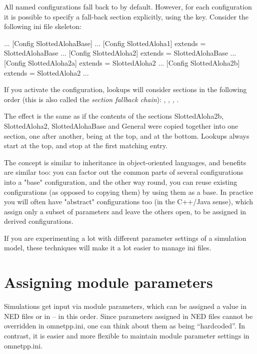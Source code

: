 All named configurations fall back to \ttt{[General]} by default. However, for
each configuration it is possible to specify a fall-back section
explicitly, using the  key. Consider the following ini file
skeleton:

\begin{inifile}
[General]
...
[Config SlottedAlohaBase]
...
[Config SlottedAloha1]
extends = SlottedAlohaBase
...
[Config SlottedAloha2]
extends = SlottedAlohaBase
...
[Config SlottedAloha2a]
extends = SlottedAloha2
...
[Config SlottedAloha2b]
extends = SlottedAloha2
...
\end{inifile}


If you activate the  configuration, lookups will consider
sections in the following order (this is also called the
\textit{section fallback chain}): ,
, , .

The effect is the same as if the contents of the sections
SlottedAloha2b, SlottedAloha2, SlottedAlohaBase and General were copied
together into one section, one after another, 
being at the top, and \ttt{[General]} at the bottom. Lookups always start at
the top, and stop at the first matching entry.

The concept is similar to inheritance in object-oriented languages,
and benefits are similar too: you can factor out the common parts of
several configurations into a "base"
configuration, and the other way round, you can reuse existing
configurations (as opposed to copying them) by using them as a base. In
practice you will often have "abstract"
configurations too (in the C++/Java sense), which assign only a subset
of parameters and leave the others open, to be assigned in derived
configurations.

If you are experimenting a lot with different parameter settings of a
simulation model, these techniques will make it a lot easier to manage
ini files.

\section{Assigning module parameters}
\label{sec:ch-config-sim:parameter-settings}

Simulations get input via module parameters, which can be assigned a
value in NED files or in  -- in this order. Since parameters
assigned in NED files cannot be overridden in omnetpp.ini, one can
think about them as being ``hardcoded''. In contrast, it is easier
and more flexible to maintain module parameter settings in omnetpp.ini.

